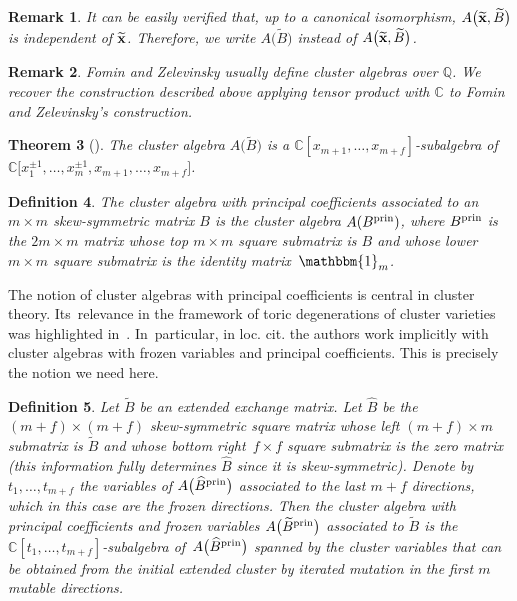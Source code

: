\documentclass[10pt,a4paper]{amsart}
\newcommand{\thlabel}[1]{\label{#1}}
\newtheorem{Theorem}{Theorem}[section]
\newtheorem{Definition}[Theorem]{Definition}
\newtheorem{Remark}[Theorem]{Remark}}
\numberwithin{equation}{section}
\begin{document}
\begin{Remark}
It can be easily verified that, up to a canonical isomorphism, $A\big(\widetilde{{\bf x}},\widetilde{B}\big)$ is independent of $\widetilde{{\bf x}}$. Therefore, we write $A\big(\widetilde{B}\big)$ instead of $A\big(\widetilde{{\bf x}},\widetilde{B}\big)$.
\end{Remark}

\begin{Remark}
Fomin and Zelevinsky usually define cluster algebras over $\mathbb Q$. We recover the construction described above applying tensor product with $\mathbb C$ to Fomin and Zelevinsky's construction.
\end{Remark}

\begin{Theorem}[{\cite[Laurent phenomenon]{FZ_clustersIV}}]
\thlabel{thm:SLaurent}
The cluster algebra $A\big(\widetilde{B}\big)$ is a $\mathbb C[x_{m+1},\dots , x_{m+f}]$-subalgebra of $\mathbb C\big[x_1^{\pm 1}, \dots , x_m^{\pm 1},x_{m+1},\dots , x_{m+f}\big]$.
\end{Theorem}


\begin{Definition}\thlabel{def:prin}
The cluster algebra with {\it principal coefficients} associated to an $ m \times m$ skew-symmetric matrix $B$ is the cluster algebra $A(B^{\rm{prin}})$, where $B^{\rm{prin}}$ is the $2m \times m$ matrix whose top $m\times m$ square submatrix is $B$ and whose lower $m\times m$ square submatrix is the identity matrix~$\mathbbm{1}_m$.
\end{Definition}

The notion of cluster algebras with principal coefficients is central in cluster theory. Its~rele\-vance in the framework of toric degenerations of cluster varieties was highlighted in~\cite{GHKK}. In~particular, in loc. cit. the authors work implicitly with cluster algebras with frozen variables and principal coefficients. This is precisely the notion we need here.

\begin{Definition}
Let $ \widetilde{B}$ be an extended exchange matrix. Let $\widehat{B}$ be the $(m+f)\times (m+f)$ skew-symmetric square matrix whose left $(m+f)\times m$ submatrix is $\widetilde{B}$ and whose bottom right~$f \times f $ square submatrix is the zero matrix (this information fully determines $ \widehat{B}$ since it is skew-symmetric).
Denote by $t_1,\dots , t_{m+f}$ the variables of $A\big(\widehat{B}^{\rm prin}\big) $ associated to the last $m+f$ directions, which in this case are the frozen directions.
Then the {\it cluster algebra with principal coefficients and frozen variables} $A\big(\widetilde{B}^{\rm prin}\big) $ associated to $\widetilde{B}$ is the $\mathbb{C}[t_1,\dots , t_{m+f}]$-subalgebra of~$A\big(\widehat{B}^{\rm prin}\big)$ spanned by the cluster variables that can be obtained from the initial extended cluster by iterated mutation in the first $m$ mutable directions.
\end{Definition}
\end{document}
